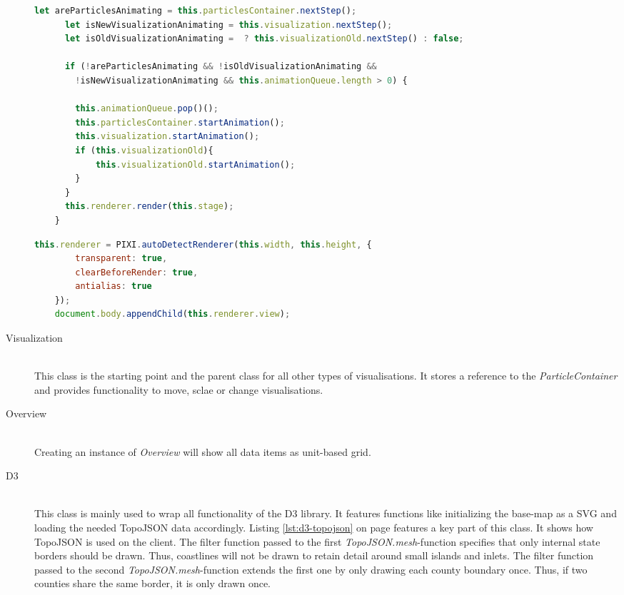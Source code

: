 \begin{description}
\begin{lstlisting}[language=JavaScript, caption={Render function of the canvas class.}, label={lst:canvas-render}]
      let areParticlesAnimating = this.particlesContainer.nextStep();
      let isNewVisualizationAnimating = this.visualization.nextStep();
      let isOldVisualizationAnimating =  ? this.visualizationOld.nextStep() : false;

      if (!areParticlesAnimating && !isOldVisualizationAnimating &&
        !isNewVisualizationAnimating && this.animationQueue.length > 0) {

        this.animationQueue.pop()();
        this.particlesContainer.startAnimation();
        this.visualization.startAnimation();
        if (this.visualizationOld){
            this.visualizationOld.startAnimation();
        }
      }
      this.renderer.render(this.stage);
    }
\end{lstlisting}

\begin{lstlisting}[language=JavaScript, caption={Pixi's autodetect-renderer.}, label={lst:canvas-autodecet-renderer}]
    this.renderer = PIXI.autoDetectRenderer(this.width, this.height, {
        transparent: true,
        clearBeforeRender: true,
        antialias: true
    });
    document.body.appendChild(this.renderer.view);
\end{lstlisting}

\item[Visualization] \hfill \\
This class is the starting point and the parent class for all other types of visualisations. It stores a reference to the \textit{ParticleContainer} and provides functionality to move, sclae or change visualisations.

\item[Overview] \hfill \\
Creating an instance of \textit{Overview} will show all data items as unit-based grid.

\item[D3] \hfill \\
This class is mainly used to wrap all functionality of the \ac{D3} library. It features functions like initializing the base-map as a \ac{SVG} and loading the needed TopoJSON data accordingly. Listing \ref{lst:d3-topojson} on page \pageref{lst:d3-topojson} features a key part of this class. It shows how TopoJSON is used on the client. The filter function passed to the first \textit{TopoJSON.mesh}-function specifies that only internal state borders should be drawn. Thus, coastlines will not be drawn to retain detail around small islands and inlets. The filter function passed to the second \textit{TopoJSON.mesh}-function extends the first one by only drawing each county boundary once. Thus, if two counties share the same border, it is only drawn once.


\end{description}
